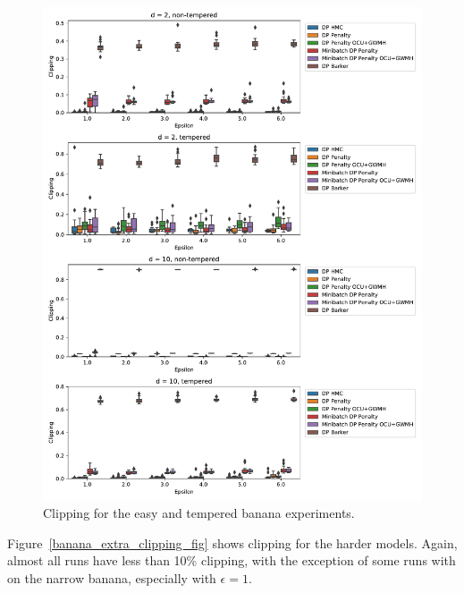 \documentclass[english,twoside,openright]{HYgraduMLDS}
\begin{document}
\begin{figure}
  \centering
  \includegraphics[width=\textwidth]{figures/banana_clipping.pdf}
  \caption{
    Clipping for the easy and tempered banana experiments.
  }
  \label{banana_clipping_fig}
\end{figure}

Figure~\ref{banana_extra_clipping_fig} shows clipping for the harder models.
Again, almost all runs have less than 10\% clipping, with the exception of
some runs with on the narrow banana, especially with \(\epsilon = 1\).
\end{document}
